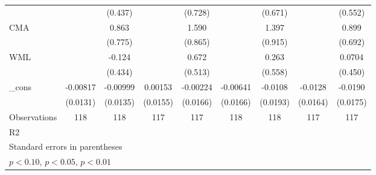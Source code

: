 {\begin{tabular}{l*{8}{c}}
                    &                     &     (0.437)         &                     &     (0.728)         &                     &     (0.671)         &                     &     (0.552)         \\
CMA                 &                     &       0.863         &                     &       1.590\sym{*}  &                     &       1.397         &                     &       0.899         \\
                    &                     &     (0.775)         &                     &     (0.865)         &                     &     (0.915)         &                     &     (0.692)         \\
WML                 &                     &      -0.124         &                     &       0.672         &                     &       0.263         &                     &      0.0704         \\
                    &                     &     (0.434)         &                     &     (0.513)         &                     &     (0.558)         &                     &     (0.450)         \\
\_cons              &    -0.00817         &    -0.00999         &     0.00153         &    -0.00224         &    -0.00641         &     -0.0108         &     -0.0128         &     -0.0190         \\
                    &    (0.0131)         &    (0.0135)         &    (0.0155)         &    (0.0166)         &    (0.0166)         &    (0.0193)         &    (0.0164)         &    (0.0175)         \\
\hline
Observations        &         118         &         118         &         117         &         117         &         118         &         118         &         117         &         117         \\
R2                  &                     &                     &                     &                     &                     &                     &                     &                     \\
\hline\hline
\multicolumn{9}{l}{\footnotesize Standard errors in parentheses}\\
\multicolumn{9}{l}{\footnotesize \sym{*} \(p<0.10\), \sym{**} \(p<0.05\), \sym{***} \(p<0.01\)}\\
\end{tabular}
}
